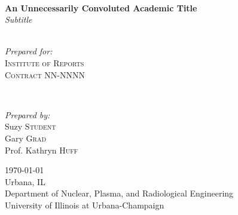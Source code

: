\begin{titlepage}
	\HRule\\[0.4cm]
	
	{\huge\bfseries An Unnecessarily Convoluted Academic Title}\\[0.4cm] %
	
        {\LARGE\textit{Subtitle}}\\[0.4cm] %
	\HRule\\[1.5cm]
	
	
	\begin{minipage}{0.4\textwidth}
		\begin{flushleft}
			\large
			\textit{Prepared for:}\\
			\textsc{Institute of Reports}\\ %
                        \textsc{Contract} NN-NNNN\\ %
                \end{flushleft}
	\end{minipage}
	~
	\begin{minipage}{0.4\textwidth}
		\begin{flushright}
			\large
			\textit{Prepared by:}\\
			Suzy \textsc{Student}\\ %
			Gary \textsc{Grad}\\ %
			Prof. Kathryn \textsc{Huff} %
		\end{flushright}
	\end{minipage}
	
	
	
	\vfill\vfill\vfill %
	
	{\large\today}\\ %
        \vfill
	{\large Urbana, IL}\\ %
        {\large Department of Nuclear, Plasma, and Radiological Engineering\\
        University of Illinois at Urbana-Champaign}\\ %
	
	
	
	\vfill %
	
\end{titlepage}




